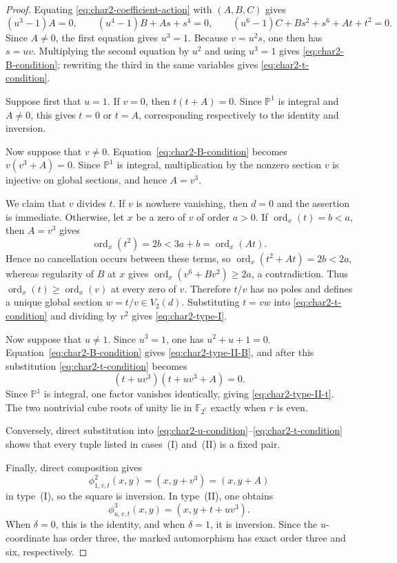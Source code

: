 \documentclass[a4paper,12pt]{amsart}
\theoremstyle{definition}
\newcommand{\Fb}{\mathbb{F}}
\newcommand{\Pb}{\mathbb{P}}
\begin{document}
\begin{proof}
Equating \eqref{eq:char2-coefficient-action} with $(A,B,C)$ gives
\[
(u^3-1)A=0,
\qquad
(u^4-1)B+As+s^4=0,
\qquad
(u^6-1)C+Bs^2+s^6+At+t^2=0.
\]
Since $A\neq0$, the first equation gives $u^3=1$.  Because $v=u^2s$, one then has $s=uv$.  Multiplying the second equation by $u^2$ and using $u^3=1$ gives \eqref{eq:char2-B-condition}; rewriting the third in the same variables gives \eqref{eq:char2-t-condition}.

Suppose first that $u=1$.  If $v=0$, then $t(t+A)=0$.  Since $\Pb^1$ is integral and $A\neq0$, this gives $t=0$ or $t=A$, corresponding respectively to the identity and inversion.

Now suppose that $v\neq0$.  Equation~\eqref{eq:char2-B-condition} becomes $v(v^3+A)=0$.  Since $\Pb^1$ is integral, multiplication by the nonzero section $v$ is injective on global sections, and hence $A=v^3$.

We claim that $v$ divides $t$.  If $v$ is nowhere vanishing, then $d=0$ and the assertion is immediate.  Otherwise, let $x$ be a zero of $v$ of order $a>0$.  If $\operatorname{ord}_x(t)=b<a$, then $A=v^3$ gives
\[
\operatorname{ord}_x(t^2)=2b<3a+b=\operatorname{ord}_x(At).
\]
Hence no cancellation occurs between these terms, so $\operatorname{ord}_x(t^2+At)=2b<2a$, whereas regularity of $B$ at $x$ gives $\operatorname{ord}_x(v^6+Bv^2)\geq2a$, a contradiction.  Thus $\operatorname{ord}_x(t)\geq\operatorname{ord}_x(v)$ at every zero of $v$.  Therefore $t/v$ has no poles and defines a unique global section $w=t/v\in V_2(d)$.  Substituting $t=vw$ into \eqref{eq:char2-t-condition} and dividing by $v^2$ gives \eqref{eq:char2-type-I}.

Now suppose that $u\neq1$.  Since $u^3=1$, one has $u^2+u+1=0$.  Equation~\eqref{eq:char2-B-condition} gives \eqref{eq:char2-type-II-B}, and after this substitution \eqref{eq:char2-t-condition} becomes
\[
(t+uv^3)(t+uv^3+A)=0.
\]
Since $\Pb^1$ is integral, one factor vanishes identically, giving \eqref{eq:char2-type-II-t}.  The two nontrivial cube roots of unity lie in $\Fb_{2^r}$ exactly when $r$ is even.

Conversely, direct substitution into \eqref{eq:char2-u-condition}--\eqref{eq:char2-t-condition} shows that every tuple listed in cases~\textup{(I)} and~\textup{(II)} is a fixed pair.

Finally, direct composition gives
\[
\phi_{1,v,t}^2(x,y)=(x,y+v^3)=(x,y+A)
\]
in type~(I), so the square is inversion.  In type~(II), one obtains
\[
\phi_{u,v,t}^3(x,y)=(x,y+t+uv^3).
\]
When $\delta=0$, this is the identity, and when $\delta=1$, it is inversion.  Since the $u$-coordinate has order three, the marked automorphism has exact order three and six, respectively.
\end{proof}
\end{document}
